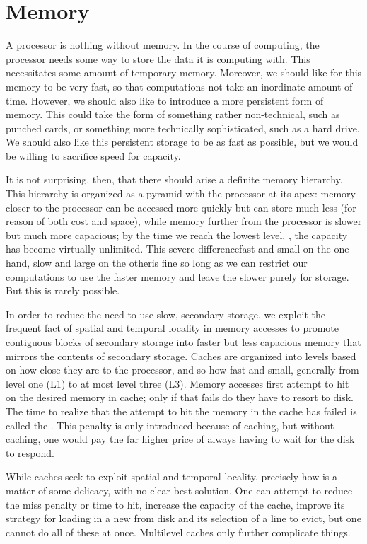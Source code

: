 \section{Memory}\label{background:computers:memory}
A processor is nothing without memory. In the course of computing, the processor needs some way to store the data it is computing with. This necessitates some amount of temporary memory. Moreover, we should like for this memory to be very fast, so that computations not take an inordinate amount of time. However, we should also like to introduce a more persistent form of memory. This could take the form of something rather non-technical, such as punched cards, or something more technically sophisticated, such as a hard drive. We should also like this persistent storage to be as fast as possible, but we would be willing to sacrifice speed for capacity.

It is not surprising, then, that there should arise a definite memory hierarchy. This hierarchy is organized as a pyramid with the processor at its apex: memory closer to the processor can be accessed more quickly but can store much less (for reason of both cost and space), while memory further from the processor is slower but much more capacious; by the time we reach the lowest level, , the capacity has become virtually unlimited. This severe difference\empause fast and small on the one hand, slow and large on the other\empause is fine so long as we can restrict our computations to use the faster memory and leave the slower purely for storage. But this is rarely possible.

In order to reduce the need to use slow, secondary storage, we exploit the frequent fact of spatial and temporal locality in memory accesses to promote contiguous blocks of secondary storage into \empause faster but less capacious memory that mirrors the contents of secondary storage. Caches are organized into levels based on how close they are to the processor, and so how fast and small, generally from level one (L1) to at most level three (L3). Memory accesses first attempt to hit on the desired memory in cache; only if that fails do they have to resort to disk. The time to realize that the attempt to hit the memory in the cache has failed is called the . This penalty is only introduced because of caching, but without caching, one would pay the far higher price of always having to wait for the disk to respond.

While caches seek to exploit spatial and temporal locality, precisely how is a matter of some delicacy, with no clear best solution. One can attempt to reduce the miss penalty or time to hit, increase the capacity of the cache, improve its strategy for loading in a new  from disk and its selection of a line to evict, but one cannot do all of these at once. Multilevel caches only further complicate things.

